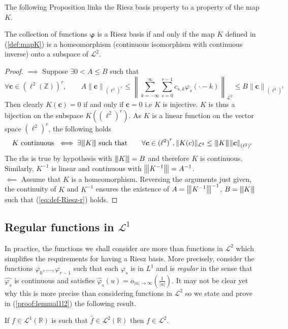 The following Proposition links the Riesz basis property to a property of the map $K$.
\begin{prop}\label{prop:Riesz-K}
  The collection of functions $\bm{\varphi}$ is a Riesz basis if and only if the map $K$ defined in (\ref{def:mapK}) is 
  a homeomorphism (continuous isomorphism with continuous inverse) onto a subspace of $\mathcal{L}^2$.
\end{prop}
\begin{proof}
  $\implies$ Suppose $\exists 0 < A \leq B$ such that
  \begin{equation}\label{eq:def-Riesz-r}
    \forall \bm{c} \in {(\ell^2(\mathbb{Z}))}^r, \qquad A {\|\bm{c}\|}_{{(\ell^2)}^r} \leq {\left\| 
    \sum_{k=-\infty}^{\infty} \sum_{s=0}^{r-1} c_{s,k} \varphi_s(\cdot-k) \right\|}_{\mathcal{L}^2} \leq B 
    {\|\bm{c}\|}_{{(\ell^2)}^r}
  \end{equation}
  Then clearly $K(\bm{c}) = 0$ if and only if $\bm{c} = 0$ i.e $K$ is injective. $K$ is thus a bijection on the subspace 
  $K\left({(\ell^2)}^r\right)$. As $K$ is a linear function on the vector space ${(\ell^2)}^r$, the following holds
  \begin{equation*}
    K \ \text{continuous} \ \iff \exists \vertiii{K} \ \text{such that} \qquad \forall \bm{c} \in {(\ell^2)}^r, 
    \|K(c)\|_{\mathcal{L}^2} \leq \vertiii{K} {\|\bm{c}\|}_{{(\ell^2)}^r}
  \end{equation*}
  The rhs is true by hypothesis with ${\left\vert\kern-0.25ex\left\vert\kern-0.25ex\left\vert K\right\vert\kern-0.25ex\right\vert\kern-0.25ex\right\vert}=B$ and therefore $K$ is continuous. Similarly, $K^{-1}$ is linear and 
  continuous with ${\left\vert\kern-0.25ex\left\vert\kern-0.25ex\left\vert K^{-1}\right\vert\kern-0.25ex\right\vert\kern-0.25ex\right\vert} = A^{-1}$. \\

  $\impliedby$ Assume that $K$ is a homeomorphism. Reversing the arguments just given, the continuity of $K$ and 
  $K^{-1}$ ensures the existence of $A = {\left\vert\kern-0.25ex\left\vert\kern-0.25ex\left\vert K^{-1}\right\vert\kern-0.25ex\right\vert\kern-0.25ex\right\vert}^{-1}$, $B={\left\vert\kern-0.25ex\left\vert\kern-0.25ex\left\vert K\right\vert\kern-0.25ex\right\vert\kern-0.25ex\right\vert}$ such that (\ref{eq:def-Riesz-r}) holds.  
\end{proof}

\subsection{Regular functions in \texorpdfstring{$\mathcal{L}^1$}{g}}

In practice, the functions we shall consider are more than functions in $\mathcal{L}^2$ which simplifies the 
requirements for having a Riesz basis. More precisely, consider the functions $\varphi_0, \ldots, \varphi_{r-1}$ such 
that each $\varphi_s$ is in $L^1$ and is \emph{regular} in the sense that $\hat{\varphi_s}$ is continuous and satisfies 
${\hat{\varphi}_s(u) = o_{|u| \to \infty}\left(\frac{1}{|u|}\right)}$. It may not be clear yet why this is more precise 
than considering functions in $\mathcal{L}^2$ so we state and prove in (\ref{proof:lemmal1l2}) the following result.
\begin{lem}\label{lemma:l1l2}
  If $f \in \mathcal{L}^1(\mathbb{R})$ is such that $\hat{f} \in \mathcal{L}^2(\mathbb{R})$ then $f \in \mathcal{L}^2$.
\end{lem}

